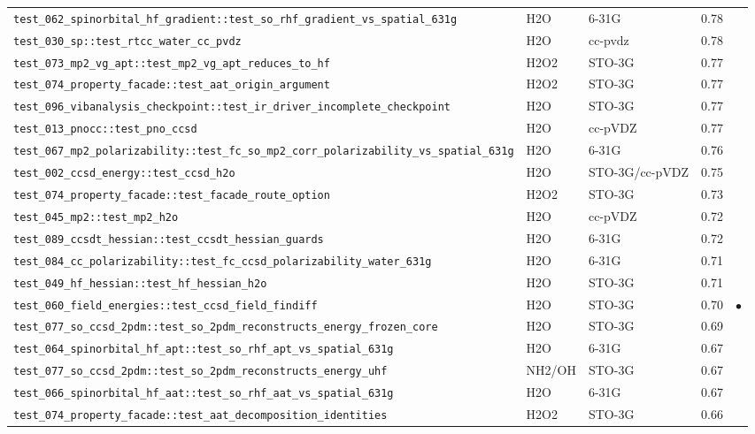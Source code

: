 \documentclass[10pt]{article}
\begin{document}
\begin{longtable}{l l l r c}
\texttt{test\_062\_spinorbital\_hf\_gradient::test\_so\_rhf\_gradient\_vs\_spatial\_631g} & H2O & 6-31G & 0.78 &  \\
\texttt{test\_030\_sp::test\_rtcc\_water\_cc\_pvdz} & H2O & cc-pvdz & 0.78 &  \\
\texttt{test\_073\_mp2\_vg\_apt::test\_mp2\_vg\_apt\_reduces\_to\_hf} & H2O2 & STO-3G & 0.77 &  \\
\texttt{test\_074\_property\_facade::test\_aat\_origin\_argument} & H2O2 & STO-3G & 0.77 &  \\
\texttt{test\_096\_vibanalysis\_checkpoint::test\_ir\_driver\_incomplete\_checkpoint} & H2O & STO-3G & 0.77 &  \\
\texttt{test\_013\_pnocc::test\_pno\_ccsd} & H2O & cc-pVDZ & 0.77 &  \\
\texttt{test\_067\_mp2\_polarizability::test\_fc\_so\_mp2\_corr\_polarizability\_vs\_spatial\_631g} & H2O & 6-31G & 0.76 &  \\
\texttt{test\_002\_ccsd\_energy::test\_ccsd\_h2o} & H2O & STO-3G/cc-pVDZ & 0.75 &  \\
\texttt{test\_074\_property\_facade::test\_facade\_route\_option} & H2O2 & STO-3G & 0.73 &  \\
\texttt{test\_045\_mp2::test\_mp2\_h2o} & H2O & cc-pVDZ & 0.72 &  \\
\texttt{test\_089\_ccsdt\_hessian::test\_ccsdt\_hessian\_guards} & H2O & 6-31G & 0.72 &  \\
\texttt{test\_084\_cc\_polarizability::test\_fc\_ccsd\_polarizability\_water\_631g} & H2O & 6-31G & 0.71 &  \\
\texttt{test\_049\_hf\_hessian::test\_hf\_hessian\_h2o} & H2O & STO-3G & 0.71 &  \\
\texttt{test\_060\_field\_energies::test\_ccsd\_field\_findiff} & H2O & STO-3G & 0.70 & $\bullet$ \\
\texttt{test\_077\_so\_ccsd\_2pdm::test\_so\_2pdm\_reconstructs\_energy\_frozen\_core} & H2O & STO-3G & 0.69 &  \\
\texttt{test\_064\_spinorbital\_hf\_apt::test\_so\_rhf\_apt\_vs\_spatial\_631g} & H2O & 6-31G & 0.67 &  \\
\texttt{test\_077\_so\_ccsd\_2pdm::test\_so\_2pdm\_reconstructs\_energy\_uhf} & NH2/OH & STO-3G & 0.67 &  \\
\texttt{test\_066\_spinorbital\_hf\_aat::test\_so\_rhf\_aat\_vs\_spatial\_631g} & H2O & 6-31G & 0.67 &  \\
\texttt{test\_074\_property\_facade::test\_aat\_decomposition\_identities} & H2O2 & STO-3G & 0.66 &  \\

\end{longtable}
\end{document}

